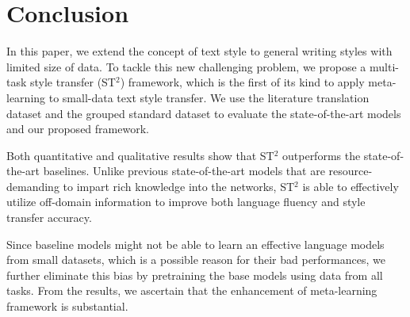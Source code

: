 \section{Conclusion}
\label{sec:conclude}

In this paper, we extend the concept of text style to general writing styles with limited size of data. To tackle this new challenging problem, we propose a multi-task style transfer (ST$^2$) framework, which is the first of its kind to apply meta-learning to small-data text style transfer. We use the literature translation dataset and the grouped standard dataset to evaluate the state-of-the-art models and our proposed framework. 

Both quantitative and qualitative results show that ST$^2$ outperforms the state-of-the-art baselines. Unlike previous state-of-the-art models that are resource-demanding to impart rich knowledge into the networks, ST$^2$ is able to effectively utilize off-domain information to improve both language fluency and style transfer accuracy.

Since baseline models might not be able to learn an effective language models from small datasets, which is a possible reason for their bad performances, we further eliminate this bias by pretraining the base models using data from all tasks. From the results, we ascertain that the enhancement of meta-learning framework is substantial.
